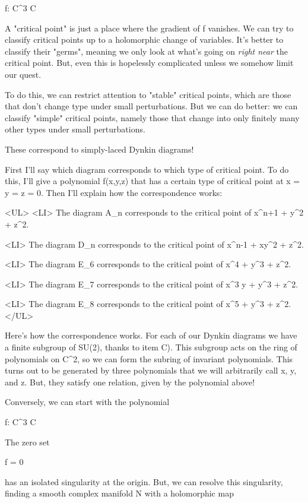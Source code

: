 f: C^{3} \to  C

A "critical point" is just a place where the gradient of f vanishes.
We can try to classify critical points up to a holomorphic change of 
variables.  It's better to classify their "germs", meaning we only 
look at what's going on \emph{right near} the critical point.   But, even 
this is hopelessly complicated unless we somehow limit our quest.

To do this, we can restrict attention to "stable" critical points, 
which are those that don't change type under small perturbations.  
But we can do better: we can classify "simple" critical points, 
namely those that change into only finitely many other types under 
small perturbations.

These correspond to simply-laced Dynkin diagrams!

First I'll say which diagram corresponds to which type of critical
point.  To do this, I'll give a polynomial f(x,y,z) that has a certain 
type of critical point at x = y = z = 0.  Then I'll explain how
the correspondence works:

<UL>
<LI>
The diagram A_{n} corresponds to the critical point of x^{n+1} + y^{2} + z^{2}.

<LI>
The diagram D_{n} corresponds to the critical point of x^{n-1} + xy^{2} + z^{2}.

<LI>
The diagram E_{6} corresponds to the critical point of x^{4} + y^{3} + z^{2}.

<LI>
The diagram E_{7} corresponds to the critical point of x^{3} y + y^{3} + z^{2}.

<LI>
The diagram E_{8} corresponds to the critical point of x^{5} + y^{3} + z^{2}.
</UL>

Here's how the correspondence works.  For each of our Dynkin diagrams
we have a finite subgroup of SU(2), thanks to item C).  This subgroup 
acts on the ring of polynomials on C^{2}, so we can form the subring of 
invariant polynomials.  This turns out to be generated by three polynomials 
that we will arbitrarily call x, y, and z.  But, they satisfy one relation, 
given by the polynomial above!

Conversely, we can start with the polynomial

f: C^{3} \to  C

The zero set

{f = 0}

has an isolated singularity at the origin.  But, we can resolve
this singularity, finding a smooth complex manifold N with a 
holomorphic map

